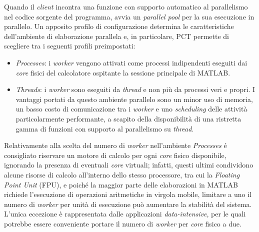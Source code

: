 Quando il \textit{client} incontra una funzione con supporto automatico al parallelismo nel codice sorgente del programma, avvia un \textit{parallel pool} per la 
sua esecuzione in parallelo. \newline
Un apposito profilo di configurazione determina le caratteristiche dell'ambiente di elaborazione parallela e, in particolare, PCT permette di scegliere tra i 
seguenti profili preimpostati:
\begin{itemize}
    \item \textit{Processes}: i \textit{worker} vengono attivati come processi indipendenti eseguiti dai \textit{core} fisici del calcolatore ospitante la sessione 
    principale di MATLAB.
    \item \textit{Threads}: i \textit{worker} sono eseguiti da \textit{thread} e non pi\`u da processi veri e propri. I vantaggi portati da questo ambiente 
    parallelo sono un minor uso di memoria, un basso costo di comunicazione tra i \textit{worker} e uno \textit{scheduling} delle attivit\`a particolarmente 
    performante, a scapito della disponibilit\`a di una ristretta gamma di funzioni con supporto al parallelismo su \textit{thread}.
\end{itemize}
Relativamente alla scelta del numero di \textit{worker} nell'ambiente \textit{Processes} \'e consigliato riservare un motore di calcolo per ogni \textit{core} 
fisico disponibile, ignorando la presenza di eventuali \textit{core} virtuali; infatti, questi ultimi condividono alcune risorse di calcolo all'interno dello 
stesso processore, tra cui la \textit{Floating Point Unit} (FPU), e poich\'e la maggior parte delle elaborazioni in MATLAB richiede l'esecuzione di operazioni 
aritmetiche in virgola mobile, limitare a uno il numero di \textit{worker} per unit\`a di esecuzione pu\`o aumentare la stabilit\`a del sistema. \newline 
L'unica eccezione \`e rappresentata dalle applicazioni \textit{data-intensive}, per le quali potrebbe essere conveniente portare il numero di \textit{worker} per 
\textit{core} fisico a due.


